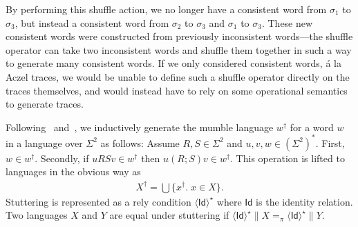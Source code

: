 \documentclass{llncs}
\newcommand{\Id}{\mathsf{Id}}
\begin{document}
\begin{center}
\end{center}

By performing this shuffle action, we no longer have a consistent word
from $\sigma_1$ to $\sigma_3$, but instead a consistent word from
$\sigma_2$ to $\sigma_3$ and $\sigma_1$ to $\sigma_3$. These new
consistent words were constructed from previously inconsistent
words---the shuffle operator can take two inconsistent words and
shuffle them together in such a way to generate many consistent
words. If we only considered consistent words, \'a la Aczel traces, we
would be unable to define such a shuffle operator directly on the
traces themselves, and would instead have to rely on some operational
semantics to generate traces.

Following~\cite{brookes_full_1993} and~\cite{dingel_refinement_2002},
we inductively generate the mumble language $w^\dagger$ for a word $w$
in a language over $\Sigma^2$ as follows: Assume $R,S \in \Sigma^2$
and $u,v,w \in (\Sigma^2)^*$. First, $w \in w^\dagger$. Secondly, if
$uRSv \in w^\dagger$ then $u(R;S)v \in w^\dagger$. This operation is
lifted to languages in the obvious way as
\begin{align*}
X^\dagger = \bigcup\{x^\dagger.\; x \in X\}.
\end{align*}
Stuttering is represented as a rely condition $\langle \Id\rangle^\star$
where $\Id$ is the identity relation. Two languages $X$ and $Y$ are
equal under stuttering if $\langle \Id\rangle^\star \| X =_\pi \langle
\Id\rangle^\star \| Y$.
\end{document}
